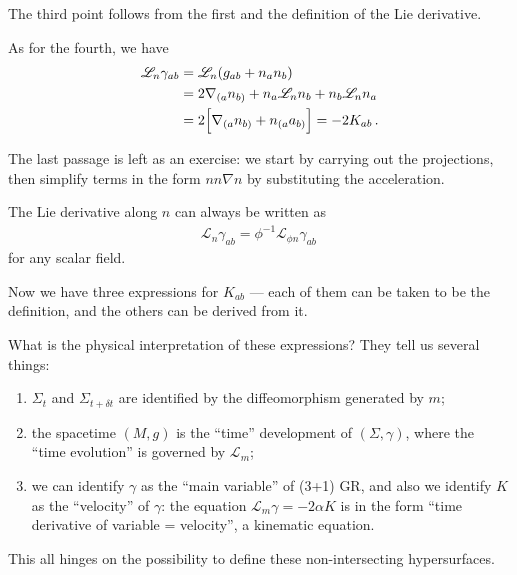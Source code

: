 \documentclass[main.tex]{subfiles}
\begin{document}
The third point follows from the first and the definition of the Lie derivative. 

As for the fourth, we have 
%
\begin{align}
\mathscr{L}_n \gamma_{ab} &= \mathscr{L}_n \qty(g_{ab} + n_a n_b)  \\
&= 2 \nabla_{(a} n_{b)} + n_a \mathscr{L}_n n_b + n_b \mathscr{L}_n n_a  \\
&= 2 \qty[\nabla_{(a} n_{b)} + n_{(a} a_{b)}] = - 2 K_{ab}
\,.
\end{align}

The last passage is left as an exercise: we start by carrying out the projections, then simplify terms in the form \(n n \nabla n\) by substituting the acceleration. 

The Lie derivative along \(n\) can always be written as 
%
\begin{align}
\mathscr{L}_n \gamma_{ab} = \phi^{-1} \mathscr{L}_{\phi n} \gamma_{ab}
\,
\end{align}
%
for any scalar field. 

Now we have three expressions for \(K_{ab}\) --- each of them can be taken to be the definition, and the others can be derived from it. 

What is the physical interpretation of these expressions?
They tell us several things: 
\begin{enumerate}
    \item \(\Sigma _t\) and \(\Sigma _{t + \delta t}\) are identified by the diffeomorphism generated by \(m\);
    \item the spacetime \((M, g)\) is the ``time'' development of \((\Sigma , \gamma )\), where the ``time evolution'' is governed by \(\mathscr{L}_m\);
    \item we can identify \(\gamma \) as the ``main variable'' of (3+1) GR, and also we identify \(K\) as the ``velocity'' of \(\gamma \): the equation \(\mathscr{L}_m \gamma = - 2 \alpha K\) is in the form ``time derivative of variable = velocity'', a kinematic equation.
\end{enumerate}

This all hinges on the possibility to define these non-intersecting hypersurfaces. 
\end{document}
